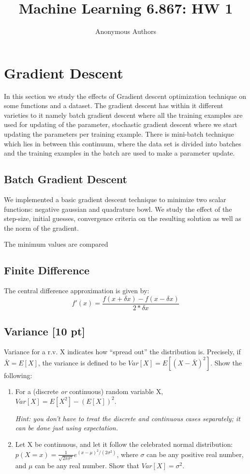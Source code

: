 \documentclass[11pt]{article}
\begin{document}
\title{Machine Learning 6.867: HW 1}
\author{Anonymous Authors}
\maketitle


\section{Gradient Descent}
In this section we study the effects of Gradient descent optimization technique on some
functions and a dataset. The gradient descent has within it different varieties to it namely batch
gradient descent where all the training examples are used for updating of the parameter,
stochastic gradient descent where we start updating the parameters per training example. There
is mini-batch technique which lies in between this continuum, where the data set is divided into batches
and the training examples in the batch are used to make a parameter update.

\subsection{Batch Gradient Descent} 
We implemented a basic gradient descent technique to minimize two scalar functions: negative
gaussian and quadrature bowl. We study the effect of the step-size, initial guesses, convergence
criteria on the resulting solution as well as the norm of the gradient.

The  minimum values are compared 

\subsection{Finite Difference}
The central difference approximation is given by: 
$$f'(x) = \frac {f(x+\delta x) - f(x - \delta x)}{2*\delta x}$$

\subsection{Variance [10 pt]}
Variance for a r.v. X indicates how ``spread out'' the distribution is.
Precisely, if $\bar{X}=E[X]$, the variance is defined to be
$Var[X]=E[(X-\bar{X})^2]$. Show the following:
\begin{enumerate}
\item For a (discrete \emph{or} continuous) random variable X,
    $Var[X]=E[X^2]-(E[X])^2$.

    \emph{Hint: you don't have to treat
    the discrete and continuous cases separately; it can be done
    just using expectation.}
\item Let X be continuous, and let it follow the celebrated
    normal distribution: $p(X=x)=\frac{1}{\sqrt{2\pi \sigma^2}}e^{(x-\mu)^2/(2\sigma^2)}$,
    where $\sigma$ can be any positive real number, and $\mu$ can be
    any real number.  Show that $Var[X]=\sigma^2$.
\end{enumerate}
\end{document}
